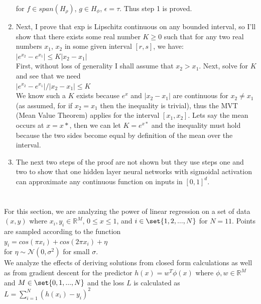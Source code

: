 \documentclass[1pt]{article}
\begin{document}
\begin{enumerate}[label=\arabic*.]
for $f \in span(H_\rho)$, $g \in H_\phi$, $\epsilon = \tau$. Thus step 1 is proved. 
\item Next, I prove that exp is Lipschitz continuous on any bounded
interval, so I'll show that there exists some real number $K \geq 0$ such that for any two real numbers $x_1$, $x_2$ in some given interval $[r, s]$, we have:\\
$|e^{x_2} - e^{x_1} | \leq K|x_2 - x_1|$\\
First, without loss of generality I shall assume that $x_2 > x_1$. Next, solve for $K$ and see that we need \\
$|e^{x_2} - e^{x_1} | / |x_2 - x_1| \leq K$\\
We know such a $K$ exists because $e^x$ and $|x_2 - x_1|$ are continuous for $x_2 \neq x_1$ (as assumed, for if $x_2 = x_1$ then the inequality is trivial), thus the MVT (Mean Value Theorem) applies for the interval $[x_1, x_2]$. Lets say the mean occurs at $x = x*$, then we can let $K = e^{x*}$ and the inequality must hold because the two sides become equal by definition of the mean over the interval.
\item The next two steps of the proof are not shown but they use steps one and two to show that one hidden layer neural networks with sigmoidal activation can approximate any continuous function on inputs in $[0, 1]^d$.
\end{enumerate}

\section{   }
For this section, we are analyzing the power of linear regression on a set of data $(x, y)$ where $x_i, y_i \in \mathbb{R}^M$, $0 \leq x \leq 1$, and $i \in \set{1, 2, ..., N}$ for $N = 11$. Points are sampled according
to the function \\
$y_i = cos(\pi x_i) + cos(2 \pi x_i) + \eta$\\
 for $\eta \sim \mathcal{N}(0,\sigma^{2})$ for small $\sigma$.\\
We analyze the effects of deriving solutions from closed form calculations as well as from gradient descent for the predictor $h(x) = w^T\phi(x)$ where $\phi, w \in \mathbb{R}^M$ and $ M \in \set{0, 1, ..., N}$ and the loss $L$ is calculated as \\
$L = \sum_{i=1}^N (h(x_i) - y_i)^2$
\end{document}
